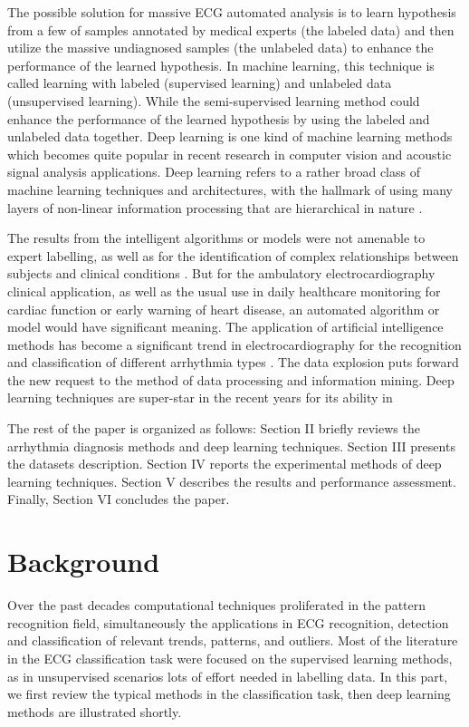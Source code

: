 \documentclass[journal]{IEEEtran}
\begin{document}
The possible solution for massive ECG automated analysis is to learn hypothesis from a few of samples annotated by medical experts (the labeled data) and then utilize the massive undiagnosed samples (the unlabeled data) to enhance the performance of the learned hypothesis.
In machine learning, this technique is called learning with labeled (supervised learning) and unlabeled data (unsupervised learning).
While the semi-supervised learning method could enhance the performance of the learned hypothesis by using the labeled and unlabeled data together.
Deep learning is one kind of machine learning methods which becomes quite popular in recent research in computer vision and acoustic signal analysis applications. 
Deep learning refers to a rather broad class of machine learning techniques and architectures, with the hallmark of using many layers of non-linear information processing that are hierarchical in nature \cite{deng2014deeplearning} . 

The results from the intelligent algorithms or models were not amenable to expert labelling, as well as for the identification of complex relationships between subjects and clinical conditions \cite{clifford2006}. 
But for the ambulatory electrocardiography clinical application, as well as the usual use in daily healthcare monitoring for cardiac function or early warning of heart disease, an automated algorithm or model would have significant meaning. 
The application of artificial intelligence methods has become a significant trend in electrocardiography for the recognition and classification of different arrhythmia types  \cite{clifford2006}. 
The data explosion puts forward the new request to the method of data processing and information mining. 
Deep learning techniques are super-star in the recent years for its ability in 

The rest of the paper is organized as follows: Section II briefly reviews the arrhythmia diagnosis methods and deep learning techniques. 
Section III presents the datasets description. 
Section IV reports the experimental methods of deep learning techniques. 
Section V describes the results and performance assessment. 
Finally, Section VI concludes the paper.

\section{Background}
Over the past decades computational techniques proliferated in the pattern recognition field, simultaneously the applications in ECG recognition, detection and classification of relevant trends, patterns, and outliers. 
Most of the literature in the ECG classification task were focused on the supervised learning methods, as in unsupervised scenarios lots of effort needed in labelling data. 
In this part, we first review the typical methods in the classification task, then deep learning methods are illustrated shortly.
\end{document}
